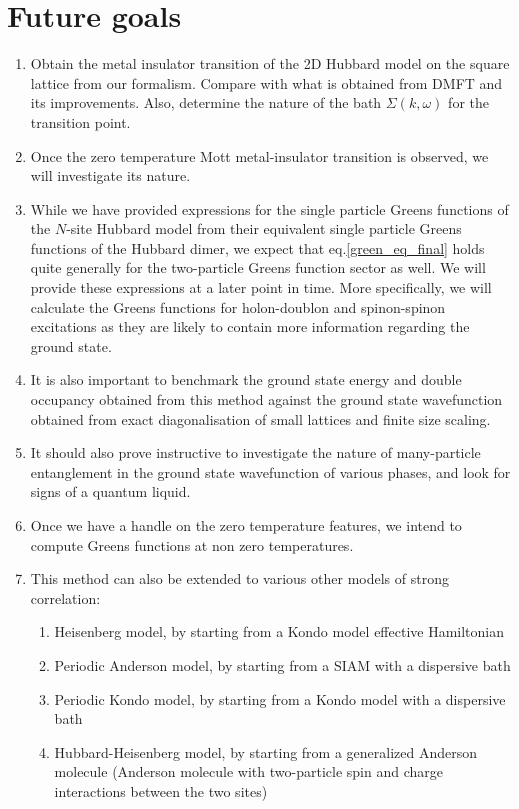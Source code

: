 \documentclass[12pt]{article}
\numberwithin{equation}{section}
\begin{document}
\section{Future goals}
\begin{enumerate}
\item Obtain the metal insulator transition of the 2D Hubbard model on the square lattice from our formalism. Compare with what is obtained from DMFT and its improvements. Also, determine the nature of the bath $\Sigma (k,\omega)$ for the transition point.

\item Once the zero temperature Mott metal-insulator transition is observed, we will investigate its nature.

\item While we have provided expressions for the single particle Greens functions of the $N$-site Hubbard model from their equivalent single particle Greens functions of the Hubbard dimer, we expect that eq.\eqref{green_eq_final} holds quite generally for the two-particle Greens function sector as well. We will provide these expressions at a later point in time. More specifically, we will calculate the Greens functions for holon-doublon and spinon-spinon excitations as they are likely to contain more information regarding the ground state.

\item It is also important to benchmark the ground state energy and double occupancy obtained from this method against the ground state wavefunction obtained from exact diagonalisation of small lattices and finite size scaling.

\item It should also prove instructive to investigate the nature of many-particle entanglement in the ground state wavefunction of various phases, and  look for signs of a quantum liquid.

\item Once we have a handle on the zero temperature features, we intend to compute Greens functions at non zero temperatures.

\item This method can also be extended to various other models of strong correlation:
	\begin{enumerate}
		\item Heisenberg model, by starting from a Kondo model effective Hamiltonian
		\item Periodic Anderson model, by starting from a SIAM with a dispersive bath
		\item Periodic Kondo model, by starting from a Kondo model with a dispersive bath
		\item Hubbard-Heisenberg model, by starting from a generalized Anderson molecule (Anderson molecule with two-particle spin and charge interactions between the two sites)
	\end{enumerate}
\end{enumerate}
\end{document}
